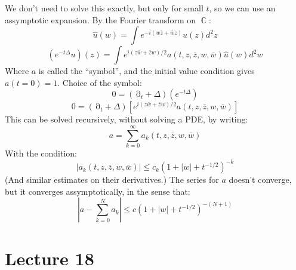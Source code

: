 \documentclass[12 pt]{article}
\DeclareMathOperator {\p} {\partial}
\DeclareMathOperator {\C} {\mathbb{C}}
\theoremstyle{plain}
\theoremstyle{definition}
\theoremstyle{remark}
\begin{document}
We don't need to solve this exactly, but only for small $t$, so we can use an assymptotic expansion. By the Fourier transform on $\C$:
\[       \hat u(w) = \int  e^{- i (w \bar z + \bar w z)}  u(z) d^2 z  \]
\[    (e^{-t\Delta} u )   (z) = \int e^{i(z\bar w + \bar z w)/2} a(t,z,\bar z, w, \bar w)  \hat u(w) d^2 w        \]
Where $a$ is called the ``symbol'', and the initial value condition gives $a(t=0) = 1$. Choice of the symbol:
\[    0 = (\p_t + \Delta) (e^{-t\Delta})       \]
\[    0 = (\p_t + \Delta) [ e^{i(z\bar w + \bar z w)/2} a(t,z,\bar z, w, \bar w)  ]     \]
This can be solved recursively, without solving a PDE, by writing:
\[       a  = \sum_{k=0}^{\infty} a_k (t, z, \bar z, w, \bar w)       \]
With the condition:
\[       |a_k (t, z, \bar z, w, \bar w)| \leq c_k (1 + |w| + t^{-1/2} )^{-k}       \]
(And similar estimates on their derivatives.) The series for $a$ doesn't converge, but it converges assymptotically, in the sense that:
\[        | a - \sum_{k=0}^N a_k | \leq c (1 + |w| + t^{-1/2})^{-(N+1)}       \]



\section*{Lecture 18}
\end{document}
